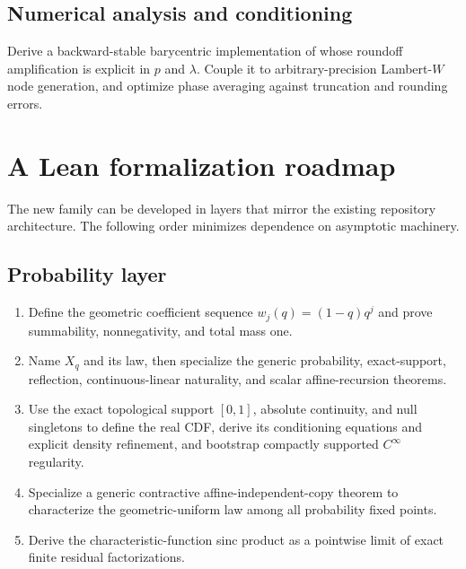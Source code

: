 \documentclass[11pt]{article}
\numberwithin{equation}{section}
\theoremstyle{definition}
\theoremstyle{remark}
\begin{document}
\subsection{Numerical analysis and conditioning}

\begin{problem}
Derive a backward-stable barycentric implementation of  whose
roundoff amplification is explicit in $p$ and $\lambda$.  Couple it to arbitrary-precision
Lambert-$W$ node generation, and optimize phase averaging against truncation and rounding
errors.
\end{problem}

\section{A Lean formalization roadmap}
\label{p10:sec:lean}

The new family can be developed in layers that mirror the existing repository architecture.
The following order minimizes dependence on asymptotic machinery.

\subsection{Probability layer}

\begin{enumerate}
\item Define the geometric coefficient sequence $w_j(q)= (1-q)q^j$ and prove summability,
      nonnegativity, and total mass one.
\item Name \(X_q\) and its law, then specialize the generic probability, exact-support,
      reflection, continuous-linear naturality, and scalar affine-recursion theorems.
\item Use the exact topological support \([0,1]\), absolute continuity, and null singletons to
      define the real CDF, derive its conditioning equations and explicit density refinement,
      and bootstrap compactly supported \(C^\infty\) regularity.
\item Specialize a generic contractive affine-independent-copy theorem to characterize the
      geometric-uniform law among all probability fixed points.
\item Derive the characteristic-function sinc product as a pointwise limit of exact finite
      residual factorizations.
\end{enumerate}
\end{document}
